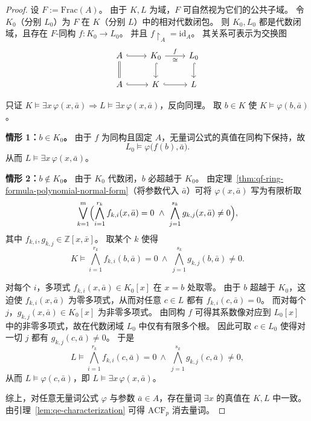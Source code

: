\documentclass[lang=cn,a4paper,newtx,section]{elegantbook}
\begin{document}
\begin{proof}
设 $F:=\mathrm{Frac}(A)$。
由于 $K,L$ 为域，$F$ 可自然视为它们的公共子域。
令 $K_0$（分别 $L_0$）为 $F$ 在 $K$（分别 $L$）中的相对代数闭包。
则 $K_0,L_0$ 都是代数闭域，且存在 $F$-同构 $f:K_0\to L_0$。
并且 $f\restriction_A=\mathrm{id}_A$。
其关系可表示为交换图
\[
\begin{tikzcd}
  A \arrow[r, hook] \arrow[d, equals] & K_0 \arrow[d, hook] \arrow[r, "f", "\cong"'] & L_0 \arrow[d, hook] \\
  A \arrow[r, hook] & K \arrow[r, hook] & L
\end{tikzcd}
\]

只证 $K\models\exists x\,\varphi(x,\bar a)\Rightarrow L\models\exists x\,\varphi(x,\bar a)$，反向同理。
取 $b\in K$ 使 $K\models\varphi(b,\bar a)$。

\textbf{情形 1：$b\in K_0$。}
由于 $f$ 为同构且固定 $A$，无量词公式的真值在同构下保持，故
\[
  L_0\models\varphi\bigl(f(b),\bar a\bigr).
\]
从而 $L\models\exists x\,\varphi(x,\bar a)$。

\textbf{情形 2：$b\notin K_0$。}
由于 $K_0$ 代数闭，$b$ 必超越于 $K_0$。
由定理~\ref{thm:qf-ring-formula-polynomial-normal-form}（将参数代入 $\bar a$）可将 $\varphi(x,\bar a)$ 写为有限析取
\[
  \bigvee_{k=1}^m\Bigl(\bigwedge_{i=1}^{r_k} f_{k,i}(x,\bar a)=0\ \wedge\ \bigwedge_{j=1}^{s_k} g_{k,j}(x,\bar a)\neq 0\Bigr),
\]
其中 $f_{k,i},g_{k,j}\in\mathbb Z[x,\bar x]$。
取某个 $k$ 使得
\[
  K\models\bigwedge_{i=1}^{r_k} f_{k,i}(b,\bar a)=0\ \wedge\ \bigwedge_{j=1}^{s_k} g_{k,j}(b,\bar a)\neq 0.
\]

对每个 $i$，多项式 $f_{k,i}(x,\bar a)\in K_0[x]$ 在 $x=b$ 处取零。
由于 $b$ 超越于 $K_0$，这迫使 $f_{k,i}(x,\bar a)$ 为零多项式，从而对任意 $c\in L$ 都有 $f_{k,i}(c,\bar a)=0$。
而对每个 $j$，$g_{k,j}(x,\bar a)\in K_0[x]$ 为非零多项式。
由同构 $f$ 可得其系数像对应到 $L_0[x]$ 中的非零多项式，故在代数闭域 $L_0$ 中仅有有限多个根。
因此可取 $c\in L_0$ 使得对一切 $j$ 都有 $g_{k,j}(c,\bar a)\neq 0$。
于是
\[
  L\models\bigwedge_{i=1}^{r_k} f_{k,i}(c,\bar a)=0\ \wedge\ \bigwedge_{j=1}^{s_k} g_{k,j}(c,\bar a)\neq 0,
\]
从而 $L\models\varphi(c,\bar a)$，即 $L\models\exists x\,\varphi(x,\bar a)$。

综上，对任意无量词公式 $\varphi$ 与参数 $\bar a\in A$，存在量词 $\exists x$ 的真值在 $K,L$ 中一致。
由引理~\ref{lem:qe-characterization} 可得 $\mathrm{ACF}_p$ 消去量词。
\end{proof}
\end{document}
